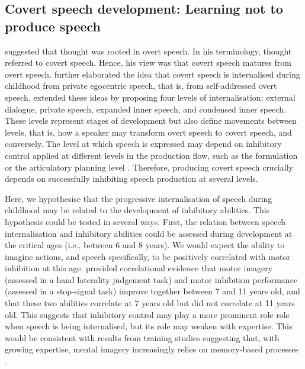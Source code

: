 \documentclass[utf8]{template/frontiersSCNS} %
\begin{document}
\subsection{Covert speech development: Learning not to produce speech}

\cite{watson_psychology_1919} suggested that thought was rooted in overt speech. In his terminology, thought referred to covert speech. Hence, his view was that covert speech matures from overt speech. \cite{vygotsky_thought_1934} further elaborated the idea that covert speech is internalised during childhood from private egocentric speech, that is, from self-addressed overt speech. \cite{fernyhough_alien_2004} extended these ideas by proposing four levels of internalisation: external dialogue, private speech, expanded inner speech, and condensed inner speech. These levels represent stages of development but also define movements between levels, that is, how a speaker may transform overt speech to covert speech, and conversely. The level at which speech is expressed may depend on inhibitory control applied at different levels in the production flow, such as the formulation or the articulatory planning level \citep{grandchamp_condialint_2019}. Therefore, producing covert speech crucially depends on successfully inhibiting speech production at several levels. 

Here, we hypothesise that the progressive internalisation of speech during childhood may be related to the development of inhibitory abilities. This hypothesis could be tested in several ways. First, the relation between speech internalisation and inhibitory abilities could be assessed during development at the critical ages (i.e., between 6 and 8 years). We would expect the ability to imagine actions, and speech specifically, to be positively correlated with motor inhibition at this age. \cite{wang_relationship_2021} provided correlational evidence that motor imagery (assessed in a hand laterality judgement task) and motor inhibition performance (assessed in a stop-signal task) improve together between 7 and 11 years old, and that these two abilities correlate at 7 years old but did not correlate at 11 years old. This suggests that inhibitory control may play a more prominent role role when speech is being internalised, but its role may weaken with expertise. This would be consistent with results from training studies suggesting that, with growing expertise, mental imagery increasingly relies on memory-based processes  \citep[e.g.,][]{tarr_mental_1989, jolicoeur_time_1985}.
\end{document}
